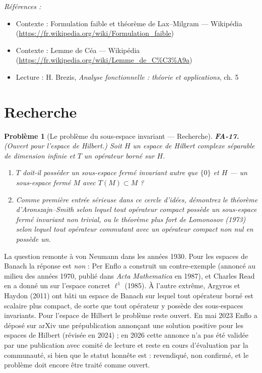\documentclass[11pt]{article}
\newtheorem{problem}{Problème}
\newenvironment{refs}{\par\small\noindent\emph{Références :}\begin{itemize}\setlength\itemsep{0pt}}{\end{itemize}\normalsize}
\begin{document}
\begin{refs}
\item Contexte : Formulation faible et théorème de Lax--Milgram --- Wikipédia (\url{https://fr.wikipedia.org/wiki/Formulation_faible})
\item Contexte : Lemme de Céa --- Wikipédia (\url{https://fr.wikipedia.org/wiki/Lemme_de_C%C3%A9a})
\item Lecture : H. Brezis, \textit{Analyse fonctionnelle : théorie et applications}, ch. 5
\end{refs}

\bigskip


\section*{Recherche}

\begin{problem}[{Le problème du sous-espace invariant --- Recherche}]
\textbf{FA-17.} (Ouvert pour l'espace de Hilbert.) Soit $ H $ un espace de Hilbert complexe
séparable de dimension infinie et $ T $ un opérateur borné sur $ H $.
\begin{enumerate}
\item[(a)] $ T $ doit-il posséder un sous-espace fermé invariant autre que $ \{0\} $ et $ H $ --- un
sous-espace fermé $ M $ avec $ T(M) \subset M $ ?
\item[(b)] Comme première entrée sérieuse dans ce cercle d'idées, démontrez le théorème d'Aronszajn--Smith
selon lequel tout opérateur \textit{compact} possède un sous-espace fermé invariant non trivial, ou le
théorème plus fort de Lomonosov (1973) selon lequel tout opérateur commutant avec un opérateur
compact non nul en possède un.
\end{enumerate}

\end{problem}

\noindent La question remonte à von Neumann dans les années 1930. Pour les espaces de Banach la
réponse est \textit{non} : Per Enflo a construit un contre-exemple (annoncé au milieu des années 1970,
publié dans \textit{Acta Mathematica} en 1987), et Charles Read en a donné un sur l'espace concret
$ \ell^1 $ (1985). À l'autre extrême, Argyros et Haydon (2011) ont bâti un espace de Banach sur lequel
tout opérateur borné est scalaire plus compact, de sorte que tout opérateur y possède des sous-espaces
invariants. Pour l'espace de Hilbert le problème reste ouvert. En mai 2023 Enflo a déposé sur arXiv une
prépublication annonçant une solution positive pour les espaces de Hilbert (révisée en 2024) ; en 2026
cette annonce n'a pas été validée par une publication avec comité de lecture et reste en cours
d'évaluation par la communauté, si bien que le statut honnête est : revendiqué, non confirmé, et le
problème doit encore être traité comme ouvert.
\end{document}

